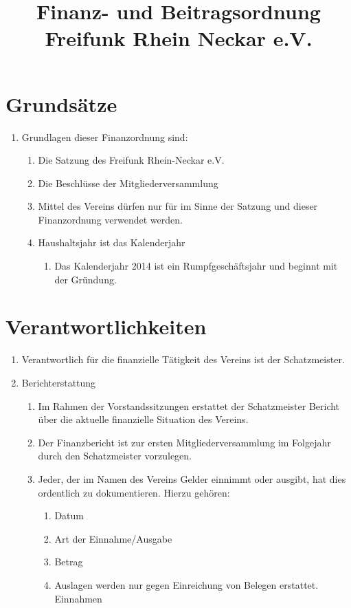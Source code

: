 \documentclass[12pt,a4paper,titlepage]{scrartcl}
\title{Finanz- und Beitragsordnung Freifunk Rhein Neckar e.V.}
\begin{document}
\maketitle
{}
\thispagestyle{empty}
\newpage
{}
\setcounter{page}{1}

\section{Grundsätze}
\begin{enumerate}
\item Grundlagen dieser Finanzordnung sind:
	\begin{enumerate}
	\item Die Satzung des Freifunk Rhein-Neckar e.V.
	\item Die Beschlüsse der Mitgliederversammlung 
	\item Mittel des Vereins dürfen nur für im Sinne der Satzung und dieser Finanzordnung 
verwendet werden. 
	\item Haushaltsjahr ist das Kalenderjahr 
		\begin{enumerate}
		\item Das Kalenderjahr 2014 ist ein Rumpfgeschäftsjahr und beginnt mit der Gründung. 
		\end{enumerate}
	\end{enumerate}
\end{enumerate}
	
\section{Verantwortlichkeiten}
\begin{enumerate}
\item Verantwortlich für die finanzielle Tätigkeit des Vereins ist der Schatzmeister. 
\item Berichterstattung 
	\begin{enumerate}
	
	
	\item Im Rahmen der Vorstandssitzungen erstattet der Schatzmeister Bericht über 
die aktuelle finanzielle Situation des Vereins. 
	\item Der Finanzbericht ist zur ersten Mitgliederversammlung im Folgejahr durch 
den Schatzmeister vorzulegen. 
	\item Jeder, der im Namen des Vereins Gelder einnimmt oder ausgibt, hat dies ordentlich zu dokumentieren. Hierzu gehören:
		\begin{enumerate}
		\item Datum 
		\item Art der Einnahme/Ausgabe 
		\item Betrag 
		\item Auslagen werden nur gegen Einreichung von Belegen erstattet. 
Einnahmen
		\end{enumerate}
	\end{enumerate}
\end{enumerate}
\end{document}
